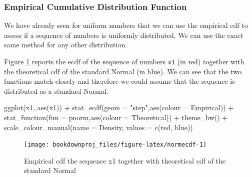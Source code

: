 \documentclass[
]{book}
\newenvironment{Shaded}{\begin{snugshade}}{\end{snugshade}}
\newcommand{\AttributeTok}[1]{\textcolor[rgb]{0.77,0.63,0.00}{#1}}
\newcommand{\FunctionTok}[1]{\textcolor[rgb]{0.00,0.00,0.00}{#1}}
\newcommand{\NormalTok}[1]{#1}
\newcommand{\SpecialCharTok}[1]{\textcolor[rgb]{0.00,0.00,0.00}{#1}}
\newcommand{\StringTok}[1]{\textcolor[rgb]{0.31,0.60,0.02}{#1}}
\theoremstyle{definition}
\theoremstyle{definition}
\theoremstyle{definition}
\theoremstyle{definition}
\theoremstyle{remark}
\begin{document}
\hypertarget{empirical-cumulative-distribution-function}{%
\subsubsection{Empirical Cumulative Distribution Function}\label{empirical-cumulative-distribution-function}}

We have already seen for uniform numbers that we can use the empirical cdf to assess if a sequence of numbers is uniformly distributed. We can use the exact same method for any other distribution.

Figure \ref{fig:normecdf} reports the ecdf of the sequence of numbers \texttt{x1} (in red) together with the theoretical cdf of the standard Normal (in blue). We can see that the two functions match closely and therefore we could assume that the sequence is distributed as a standard Normal.

\begin{Shaded}
\begin{Highlighting}[]
\FunctionTok{ggplot}\NormalTok{(x1, }\FunctionTok{aes}\NormalTok{(x1)) }\SpecialCharTok{+}
   \FunctionTok{stat\_ecdf}\NormalTok{(}\AttributeTok{geom =} \StringTok{"step"}\NormalTok{,}\FunctionTok{aes}\NormalTok{(}\AttributeTok{colour =} \StringTok{\textquotesingle{}Empirical\textquotesingle{}}\NormalTok{)) }\SpecialCharTok{+}
   \FunctionTok{stat\_function}\NormalTok{(}\AttributeTok{fun =}\NormalTok{ pnorm,}\FunctionTok{aes}\NormalTok{(}\AttributeTok{colour =} \StringTok{\textquotesingle{}Theoretical\textquotesingle{}}\NormalTok{)) }\SpecialCharTok{+}
   \FunctionTok{theme\_bw}\NormalTok{() }\SpecialCharTok{+}      
   \FunctionTok{scale\_colour\_manual}\NormalTok{(}\AttributeTok{name =} \StringTok{\textquotesingle{}Density\textquotesingle{}}\NormalTok{, }\AttributeTok{values =} \FunctionTok{c}\NormalTok{(}\StringTok{\textquotesingle{}red\textquotesingle{}}\NormalTok{, }\StringTok{\textquotesingle{}blue\textquotesingle{}}\NormalTok{))}
\end{Highlighting}
\end{Shaded}

\begin{figure}

{\centering \texttt{[image: bookdownproj\_files/figure-latex/normecdf-1]} 

}

\caption{Empirical cdf the sequence x1 together with theoretical cdf of the standard Normal}\label{fig:normecdf}
\end{figure}
\end{document}
